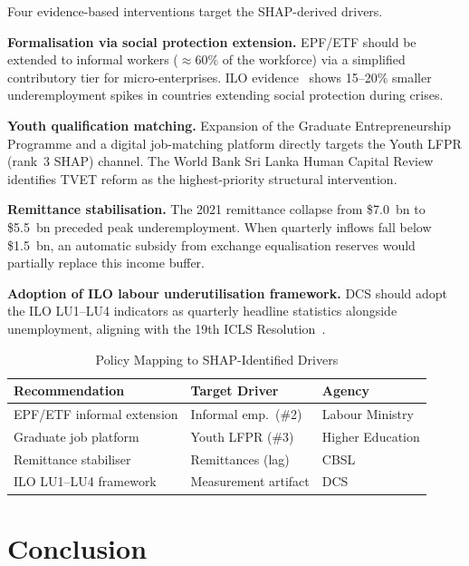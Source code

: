 \documentclass[conference]{IEEEtran}
\begin{document}
Four evidence-based interventions target the SHAP-derived drivers.

\textbf{Formalisation via social protection extension.} EPF/ETF should be
extended to informal workers (${\approx}60\%$ of the workforce) via a
simplified contributory tier for micro-enterprises. ILO
evidence~\cite{iloweso2024} shows 15--20\% smaller underemployment spikes
in countries extending social protection during crises.

\textbf{Youth qualification matching.} Expansion of the Graduate
Entrepreneurship Programme and a digital job-matching platform directly
targets the Youth LFPR (rank~3 SHAP) channel. The World Bank Sri Lanka
Human Capital Review~\cite{worldbank2023} identifies TVET reform as the
highest-priority structural intervention.

\textbf{Remittance stabilisation.} The 2021 remittance collapse from
\$7.0~bn to \$5.5~bn preceded peak underemployment. When quarterly
inflows fall below \$1.5~bn, an automatic subsidy from exchange
equalisation reserves would partially replace this income buffer.

\textbf{Adoption of ILO labour underutilisation framework.} DCS should
adopt the ILO LU1--LU4 indicators as quarterly headline statistics
alongside unemployment, aligning with the 19th ICLS Resolution~\cite{ilo2013}.

\begin{table}[htbp]
\centering
\caption{Policy Mapping to SHAP-Identified Drivers}
\label{tab:policy}
\footnotesize
\setlength{\tabcolsep}{4pt}
\begin{tabular}{@{}lll@{}}
\toprule
\textbf{Recommendation} & \textbf{Target Driver} & \textbf{Agency} \\
\midrule
EPF/ETF informal extension  & Informal emp.\ (\#2)  & Labour Ministry \\
Graduate job platform       & Youth LFPR (\#3)      & Higher Education \\
Remittance stabiliser       & Remittances (lag)     & CBSL            \\
ILO LU1--LU4 framework      & Measurement artifact  & DCS             \\
\bottomrule
\end{tabular}
\end{table}

\section{Conclusion}
\end{document}
